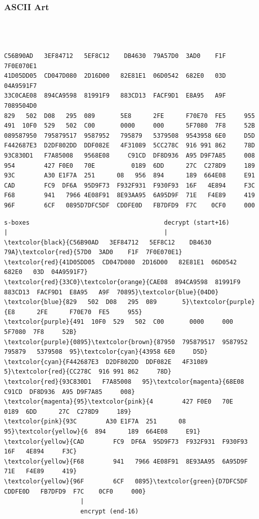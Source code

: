 \documentclass{beamer}
\begin{document}
\begin{frame}[fragile]
\frametitle{ASCII Art}
\hspace{-2em}
\begin{overprint}
\scriptsize{
    \begin{Verbatim}[commandchars=\\\{\}]



C56B90AD   3EF84712   5EF8C12    DB4630  79A57D0  3AD0    F1F  7F0E070E1
41D05DD05  CD047D080  2D16D00   82E81E1  06D0542  682E0   03D  04A9591F7
33C0CAE08  894CA9598  81991F9   883CD13  FACF9D1  E8A95   A9F  7089504D0
829   502  D08   295  089       5E8      2FE      F70E70  FE5     955
491  10F0  529   502  C00       0000     000      5F7080  7F8     52B
089587950  795879517  9587952   795879   5379508  9543958 6E0     D5D
F442687E3  D2DF802DD  DDF082E   4F31089  5CC278C  916 991 862     78D
93C830D1   F7A85008   9568E08     C91CD  DF8D936  A95 D9F7A85     008
954        427 F0E0   70E          0189  6DD      27C  C278D9     189
93C        A30 E1F7A  251      08   956  894      189  664E08     E91
CAD        FC9  DF6A  95D9F73  F932F931  F930F93  16F   4E894     F3C
F68        941   7966 4E08F91  8E93AA95  6A95D9F  71E   F4E89     419
96F        6CF   0895D7DFC5DF  CDDFE0D   FB7DFD9  F7C    0CF0     000
    \end{Verbatim}
}
\scriptsize{
    \begin{Verbatim}[commandchars=\\\{\}]
s-boxes                                     decrypt (start+16)
|                                           |
\textcolor{black}{C56B90AD   3EF84712   5EF8C12    DB4630  79A}\textcolor{red}{57D0  3AD0    F1F  7F0E070E1}
\textcolor{red}{41D05DD05  CD047D080  2D16D00   82E81E1  06D0542  682E0   03D  04A9591F7}
\textcolor{red}{33C0}\textcolor{orange}{CAE08  894CA9598  81991F9   883CD13  FACF9D1  E8A95   A9F  70895}\textcolor{blue}{04D0}
\textcolor{blue}{829   502  D08   295  089       5}\textcolor{purple}{E8      2FE      F70E70  FE5     955}
\textcolor{purple}{491  10F0  529   502  C00       0000     000      5F7080  7F8     52B}
\textcolor{purple}{0895}\textcolor{brown}{87950  795879517  9587952   795879   5379508  95}\textcolor{cyan}{43958 6E0     D5D}
\textcolor{cyan}{F442687E3  D2DF802DD  DDF082E   4F31089  5}\textcolor{red}{CC278C  916 991 862     78D}
\textcolor{red}{93C830D1   F7A85008   95}\textcolor{magenta}{68E08     C91CD  DF8D936  A95 D9F7A85     008}
\textcolor{magenta}{95}\textcolor{pink}{4        427 F0E0   70E          0189  6DD      27C  C278D9     189}
\textcolor{pink}{93C        A30 E1F7A  251      08   95}\textcolor{yellow}{6  894      189  664E08     E91}
\textcolor{yellow}{CAD        FC9  DF6A  95D9F73  F932F931  F930F93  16F   4E894     F3C}
\textcolor{yellow}{F68        941   7966 4E08F91  8E93AA95  6A95D9F  71E   F4E89     419}
\textcolor{yellow}{96F        6CF   0895}\textcolor{green}{D7DFC5DF  CDDFE0D   FB7DFD9  F7C    0CF0     000}
                     |
                     encrypt (end-16)


\end{Verbatim}}
\end{overprint}
\end{frame}
\end{document}
